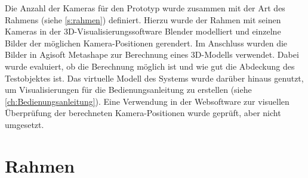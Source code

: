\documentclass[./00PhotoBox.tex]{subfiles}
\begin{document}
Die Anzahl der Kameras für den Prototyp wurde zusammen mit der Art des Rahmens (siehe \autoref{s:rahmen}) definiert. Hierzu wurde der Rahmen mit seinen Kameras in der 3D-Visualisierungssoftware Blender modelliert und einzelne Bilder der möglichen Kamera-Positionen gerendert. Im Anschluss wurden die Bilder in Agisoft Metashape zur Berechnung eines 3D-Modells verwendet. Dabei wurde evaluiert, ob die Berechnung möglich ist und wie gut die Abdeckung des Testobjektes ist. Das virtuelle Modell des Systems wurde darüber hinaus genutzt, um Visualisierungen für die Bedienungsanleitung zu erstellen (siehe \autoref{ch:Bedienungsanleitung}). Eine Verwendung in der Websoftware zur visuellen Überprüfung der berechneten Kamera-Positionen wurde geprüft, aber nicht umgesetzt.

\section{Rahmen}
\label{s:rahmen}
\end{document}
